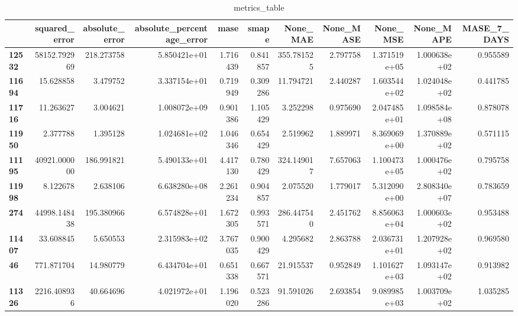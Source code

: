 \begin{table}[h]
\centering
\caption{metrics_table}
\label{table:Experiment with CNN AE and LSTM hybrid method. Global, univariate, dataset 2. Tuned with LSTM Global Univariate dataset 2}
\begin{tabular}{lrrrrrrrrrr}
\toprule
{} &  squared\_error &  absolute\_error &  absolute\_percentage\_error &      mase &     smape &     None\_MAE &  None\_MASE &      None\_MSE &     None\_MAPE &  MASE\_7\_DAYS \\
\midrule
\textbf{12532} &   58152.792969 &      218.273758 &               5.850421e+01 &  1.716439 &  0.841857 &   355.781525 &   2.797758 &  1.371519e+05 &  1.000638e+02 &     0.955589 \\
\textbf{11694} &      15.628858 &        3.479752 &               3.337154e+01 &  0.719949 &  0.309286 &    11.794721 &   2.440287 &  1.603544e+02 &  1.024048e+02 &     0.441785 \\
\textbf{11716} &      11.263627 &        3.004621 &               1.008072e+09 &  0.901386 &  1.105429 &     3.252298 &   0.975690 &  2.047485e+01 &  1.098584e+08 &     0.878078 \\
\textbf{11950} &       2.377788 &        1.395128 &               1.024681e+02 &  1.046346 &  0.654429 &     2.519962 &   1.889971 &  8.369069e+00 &  1.370889e+02 &     0.571115 \\
\textbf{11195} &   40921.000000 &      186.991821 &               5.490133e+01 &  4.417130 &  0.780429 &   324.149017 &   7.657063 &  1.100473e+05 &  1.000476e+02 &     0.795758 \\
\textbf{11998} &       8.122678 &        2.638106 &               6.638280e+08 &  2.261234 &  0.904857 &     2.075520 &   1.779017 &  5.312090e+00 &  2.808340e+07 &     0.783659 \\
\textbf{274  } &   44998.148438 &      195.380966 &               6.574828e+01 &  1.672305 &  0.993571 &   286.447540 &   2.451762 &  8.856063e+04 &  1.000603e+02 &     0.953488 \\
\textbf{11407} &      33.608845 &        5.650553 &               2.315983e+02 &  3.767035 &  0.900429 &     4.295682 &   2.863788 &  2.036731e+01 &  1.207928e+02 &     0.969580 \\
\textbf{46   } &     771.871704 &       14.980779 &               6.434704e+01 &  0.651338 &  0.667571 &    21.915537 &   0.952849 &  1.101627e+03 &  1.093147e+02 &     0.913982 \\
\textbf{11326} &    2216.408936 &       40.664696 &               4.021972e+01 &  1.196020 &  0.523286 &    91.591026 &   2.693854 &  9.089985e+03 &  1.003709e+02 &     1.035285 \\

\end{tabular}
\end{table}
